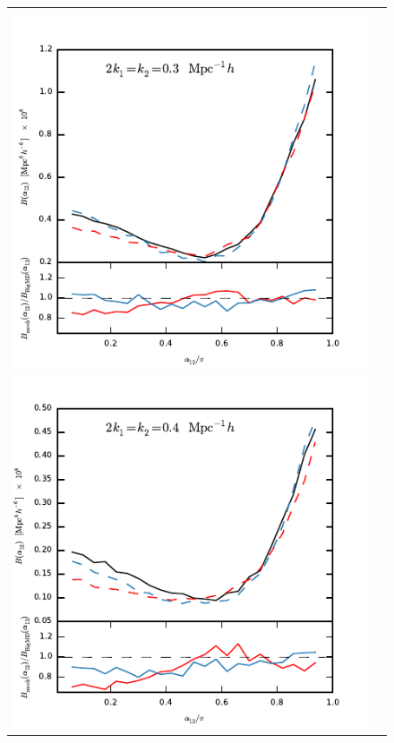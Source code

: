 \documentclass[english,usenatbib]{mn2e}
\begin{document}
\begin{figure}
\begin{tabular}{cc}
\vspace{-0.93cm}
\\
\hspace{-0.4cm}
\includegraphics[width=1.1\columnwidth]{bispec4}
\includegraphics[width=1.1\columnwidth]{bispec6}

\end{tabular}
\end{figure}
\end{document}
